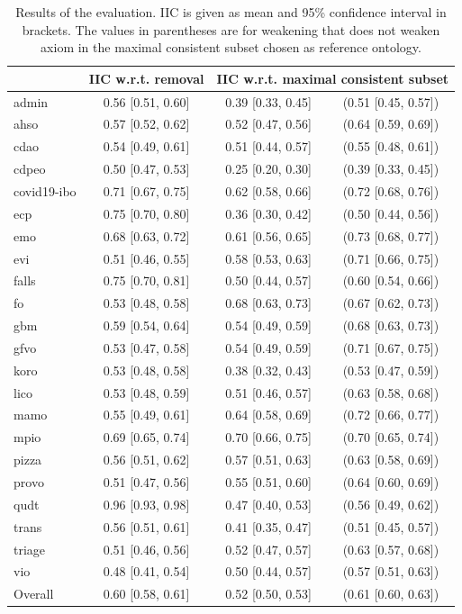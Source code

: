 \begin{table}[ht]
  \scriptsize
  \centering
  \begin{tabular}{|l|cc@{ }c|}
    \cline{2-4}
    \multicolumn{1}{l|}{} & IIC w.r.t. removal & \multicolumn{2}{c|}{IIC w.r.t. maximal consistent subset} \\
    \hline
    admin & 0.56 [0.51, 0.60] & 0.39 [0.33, 0.45] & (0.51 [0.45, 0.57]) \\
    ahso & 0.57 [0.52, 0.62] & 0.52 [0.47, 0.56] & (0.64 [0.59, 0.69]) \\
    cdao & 0.54 [0.49, 0.61] & 0.51 [0.44, 0.57] & (0.55 [0.48, 0.61]) \\
    cdpeo & 0.50 [0.47, 0.53] & 0.25 [0.20, 0.30] & (0.39 [0.33, 0.45]) \\
    covid19-ibo & 0.71 [0.67, 0.75] & 0.62 [0.58, 0.66] & (0.72 [0.68, 0.76]) \\
    ecp & 0.75 [0.70, 0.80] & 0.36 [0.30, 0.42] & (0.50 [0.44, 0.56]) \\
    emo & 0.68 [0.63, 0.72] & 0.61 [0.56, 0.65] & (0.73 [0.68, 0.77]) \\
    evi & 0.51 [0.46, 0.55] & 0.58 [0.53, 0.63] & (0.71 [0.66, 0.75]) \\
    falls & 0.75 [0.70, 0.81] & 0.50 [0.44, 0.57] & (0.60 [0.54, 0.66]) \\
    fo & 0.53 [0.48, 0.58] & 0.68 [0.63, 0.73] & (0.67 [0.62, 0.73]) \\
    gbm & 0.59 [0.54, 0.64] & 0.54 [0.49, 0.59] & (0.68 [0.63, 0.73]) \\
    gfvo & 0.53 [0.47, 0.58] & 0.54 [0.49, 0.59] & (0.71 [0.67, 0.75]) \\
    koro & 0.53 [0.48, 0.58] & 0.38 [0.32, 0.43] & (0.53 [0.47, 0.59]) \\
    lico & 0.53 [0.48, 0.59] & 0.51 [0.46, 0.57] & (0.63 [0.58, 0.68]) \\
    mamo & 0.55 [0.49, 0.61] & 0.64 [0.58, 0.69] & (0.72 [0.66, 0.77]) \\
    mpio & 0.69 [0.65, 0.74] & 0.70 [0.66, 0.75] & (0.70 [0.65, 0.74]) \\
    pizza & 0.56 [0.51, 0.62] & 0.57 [0.51, 0.63] & (0.63 [0.58, 0.69]) \\
    provo & 0.51 [0.47, 0.56] & 0.55 [0.51, 0.60] & (0.64 [0.60, 0.69]) \\
    qudt & 0.96 [0.93, 0.98] & 0.47 [0.40, 0.53] & (0.56 [0.49, 0.62]) \\
    trans & 0.56 [0.51, 0.61] & 0.41 [0.35, 0.47] & (0.51 [0.45, 0.57]) \\
    triage & 0.51 [0.46, 0.56] & 0.52 [0.47, 0.57] & (0.63 [0.57, 0.68]) \\
    vio & 0.48 [0.41, 0.54] & 0.50 [0.44, 0.57] & (0.57 [0.51, 0.63]) \\
    \hline
    Overall & 0.60 [0.58, 0.61] & 0.52 [0.50, 0.53] & (0.61 [0.60, 0.63]) \\
    \hline
  \end{tabular}
  \caption{Results of the evaluation. IIC is given as mean and 95\% confidence interval in brackets. The values in parentheses are for weakening that does not weaken axiom in the maximal consistent subset chosen as reference ontology.}
  \label{table:results}
\end{table}

